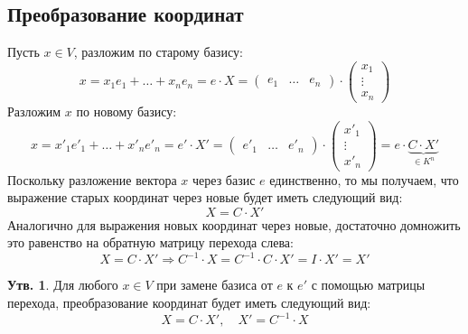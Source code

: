\documentclass[12pt]{article}
\theoremstyle{definition}
\newtheorem{prop}{Утв.}
\begin{document}
\subsection*{Преобразование координат}
Пусть $x \in V$, разложим по старому базису:
$$
	x = x_1 e_1 + \dotsc + x_n e_n  = e{\cdot}X = 
	\begin{pmatrix}
		e_1 & \dotsc & e_n	
	\end{pmatrix}{\cdot}
	\begin{pmatrix}
		x_1 \\
		\vdots\\
		x_n
	\end{pmatrix}
$$
Разложим $x$ по новому базису:
$$
	x = x'_1e'_1 + \dotsc + x'_n e'_n = e'{\cdot}X' =
	\begin{pmatrix}
		e'_1 & \dotsc & e'_n	
	\end{pmatrix}{\cdot}
	\begin{pmatrix}
		x'_1 \\
		\vdots\\
		x'_n
	\end{pmatrix} = e{\cdot}\underbrace{C{\cdot}X'}_{\in K^n}
$$
Поскольку разложение вектора $x$ через базис $e$ единственно, то мы получаем, что выражение старых координат через новые будет иметь следующий вид: 
$$
	X = C{\cdot}X'
$$
Аналогично для выражения новых координат через новые, достаточно домножить это равенство на обратную матрицу перехода слева:
$$
	X = C{\cdot}X' \Rightarrow C^{-1}{\cdot}X = C^{-1}{\cdot}C{\cdot}X' = I{\cdot}X' = X' 
$$
\begin{prop}
	Для любого $x \in V$ при замене базиса от $e$ к $e'$ с помощью матрицы перехода, преобразование координат будет иметь следующий вид:
	$$
		X = C{\cdot}X', \quad X' = C^{-1}{\cdot}X
	$$
\end{prop}
\end{document}

